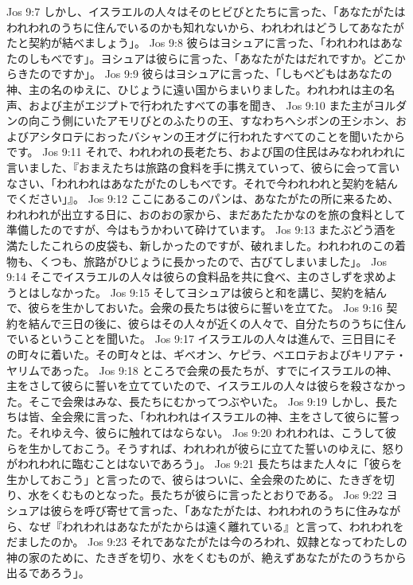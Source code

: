 Jos 9:7  しかし、イスラエルの人々はそのヒビびとたちに言った、「あなたがたはわれわれのうちに住んでいるのかも知れないから、われわれはどうしてあなたがたと契約が結べましょう」。
Jos 9:8  彼らはヨシュアに言った、「われわれはあなたのしもべです」。ヨシュアは彼らに言った、「あなたがたはだれですか。どこからきたのですか」。
Jos 9:9  彼らはヨシュアに言った、「しもべどもはあなたの神、主の名のゆえに、ひじょうに遠い国からまいりました。われわれは主の名声、および主がエジプトで行われたすべての事を聞き、
Jos 9:10  また主がヨルダンの向こう側にいたアモリびとのふたりの王、すなわちヘシボンの王シホン、およびアシタロテにおったバシャンの王オグに行われたすべてのことを聞いたからです。
Jos 9:11  それで、われわれの長老たち、および国の住民はみなわれわれに言いました、『おまえたちは旅路の食料を手に携えていって、彼らに会って言いなさい、「われわれはあなたがたのしもべです。それで今われわれと契約を結んでください」』。
Jos 9:12  ここにあるこのパンは、あなたがたの所に来るため、われわれが出立する日に、おのおの家から、まだあたたかなのを旅の食料として準備したのですが、今はもうかわいて砕けています。
Jos 9:13  またぶどう酒を満たしたこれらの皮袋も、新しかったのですが、破れました。われわれのこの着物も、くつも、旅路がひじょうに長かったので、古びてしまいました」。
Jos 9:14  そこでイスラエルの人々は彼らの食料品を共に食べ、主のさしずを求めようとはしなかった。
Jos 9:15  そしてヨシュアは彼らと和を講じ、契約を結んで、彼らを生かしておいた。会衆の長たちは彼らに誓いを立てた。
Jos 9:16  契約を結んで三日の後に、彼らはその人々が近くの人々で、自分たちのうちに住んでいるということを聞いた。
Jos 9:17  イスラエルの人々は進んで、三日目にその町々に着いた。その町々とは、ギベオン、ケピラ、ベエロテおよびキリアテ・ヤリムであった。
Jos 9:18  ところで会衆の長たちが、すでにイスラエルの神、主をさして彼らに誓いを立てていたので、イスラエルの人々は彼らを殺さなかった。そこで会衆はみな、長たちにむかってつぶやいた。
Jos 9:19  しかし、長たちは皆、全会衆に言った、「われわれはイスラエルの神、主をさして彼らに誓った。それゆえ今、彼らに触れてはならない。
Jos 9:20  われわれは、こうして彼らを生かしておこう。そうすれば、われわれが彼らに立てた誓いのゆえに、怒りがわれわれに臨むことはないであろう」。
Jos 9:21  長たちはまた人々に「彼らを生かしておこう」と言ったので、彼らはついに、全会衆のために、たきぎを切り、水をくむものとなった。長たちが彼らに言ったとおりである。
Jos 9:22  ヨシュアは彼らを呼び寄せて言った、「あなたがたは、われわれのうちに住みながら、なぜ『われわれはあなたがたからは遠く離れている』と言って、われわれをだましたのか。
Jos 9:23  それであなたがたは今のろわれ、奴隷となってわたしの神の家のために、たきぎを切り、水をくむものが、絶えずあなたがたのうちから出るであろう」。
